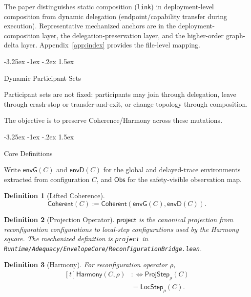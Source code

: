 \documentclass[a4paper,10pt,twocolumn,english]{article}
\makeatletter
\renewcommand{\subsection}{\@startsection{subsection}{2}{\z@}%
  {-3.25ex \@plus -1ex \@minus -.2ex}%
  {1.5ex}%
  {\raggedright\normalfont\normalsize\bfseries}}
\numberwithin{equation}{section}
\theoremstyle{paperdef}
\newtheorem{definition}{Definition}[section]
\theoremstyle{paperplain}
\theoremstyle{paperdef}
\theoremstyle{paperremark}
\theoremstyle{paperdef}
\newcommand{\Coherent}{\ensuremath{\mathsf{Coherent}}}
\newcommand{\Harmony}{\ensuremath{\mathsf{Harmony}}}
\newcommand{\Obs}{\ensuremath{\mathsf{Obs}}}
\newcommand{\ProjStep}[2]{\ensuremath{\mathsf{ProjStep}_{#2}(#1)}}
\newcommand{\LocStep}[2]{\ensuremath{\mathsf{LocStep}_{#2}(#1)}}
\newcommand{\envG}{\ensuremath{\mathsf{envG}}}
\newcommand{\envD}{\ensuremath{\mathsf{envD}}}
\makeatother
\begin{document}
The paper distinguishes static composition (\texttt{link}) in deployment-level composition from dynamic delegation (endpoint/capability transfer during execution). Representative mechanized anchors are in the deployment-composition layer, the delegation-preservation layer, and the higher-order graph-delta layer. Appendix~\ref{app:index} provides the file-level mapping.

\subsection{Dynamic Participant Sets}

Participant sets are not fixed: participants may join through delegation, leave through crash-stop or transfer-and-exit, or change topology through composition.

The objective is to preserve Coherence/Harmony across these mutations.

\subsection{Core Definitions}

Write $\envG(C)$ and $\envD(C)$ for the global and delayed-trace environments extracted from
configuration $C$, and $\Obs$ for the safety-visible observation map.

\begin{definition}[Lifted Coherence]
	\begin{equation}
		\Coherent(C) := \Coherent(\envG(C), \envD(C)).
	\end{equation}
\end{definition}

\begin{definition}[Projection Operator]
	\label{def:p3-project}
	$\mathsf{project}$ is the canonical projection from reconfiguration configurations to local-step configurations used by the Harmony square. The mechanized definition is \texttt{project} in \texttt{Runtime/\allowbreak Adequacy/\allowbreak EnvelopeCore/\allowbreak ReconfigurationBridge.lean}.
\end{definition}

\begin{definition}[Harmony]
	For reconfiguration operator $\rho$,
	\begin{equation}
		\begin{aligned}[t]
			\Harmony(C,\rho)
			 & :\iff \ProjStep{C}{\rho} \\
			 & =
			\LocStep{C}{\rho}.
		\end{aligned}
	\end{equation}
\end{definition}
\end{document}
